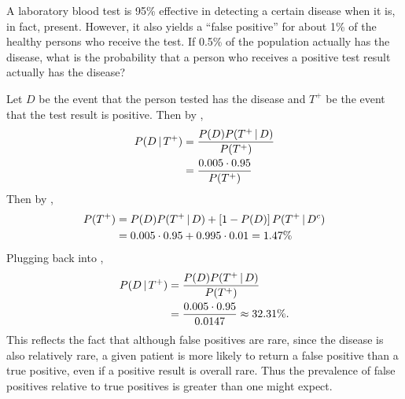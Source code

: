 \begin{changebar}
    \begin{example}
        A laboratory blood test is 95\% effective in detecting a certain disease when it is, in fact, present. However, it also yields a ``false positive'' for about 1\% of the healthy persons who receive the test. If 0.5\% of the population actually has the disease, what is the probability that a person who receives a positive test result actually has the disease? 
    \end{example}
    \begin{solution}
        Let $D$ be the event that the person tested has the disease and $T^+$ be the event that the test result is positive. Then by , \[
            \begin{aligned}
                P(D \,\vert\, T^+) &= \frac{P(D)P(T^+ \,\vert\, D)}{P(T^+)} \\
                &= \frac{0.005\cdot 0.95}{P(T^+)}
            \end{aligned}
        \] Then by , \[
            \begin{aligned}
                P(T^+) &= P(D)P(T^+ \,\vert\, D) + \left[ 1 - P(D) \right]P(T^+ \,\vert\, D^c) \\
                &= 0.005\cdot 0.95 + 0.995\cdot 0.01 = 1.47\% 
            \end{aligned}
        \] Plugging back into , \[
            \begin{aligned}
                P(D \,\vert\, T^+) &= \frac{P(D)P(T^+ \,\vert\, D)}{P(T^+)} \\
                &= \frac{0.005\cdot 0.95}{0.0147} \approx 32.31\%.
            \end{aligned}
        \] This reflects the fact that although false positives are rare, since the disease is also relatively rare, a given patient is more likely to return a false positive than a true positive, even if a positive result is overall rare. Thus the prevalence of false positives relative to true positives is greater than one might expect.
    \end{solution}
\end{changebar}

